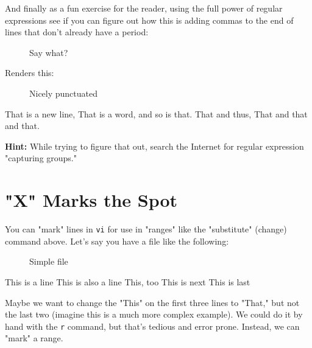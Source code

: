 \documentclass[10pt,american,]{book}
\newenvironment{Shaded}{\begin{snugshade}}{\end{snugshade}}
\newcommand{\KeywordTok}[1]{\textcolor[rgb]{0.13,0.29,0.53}{\textbf{{#1}}}}
\newcommand{\DataTypeTok}[1]{\textcolor[rgb]{0.13,0.29,0.53}{{#1}}}
\newcommand{\OtherTok}[1]{\textcolor[rgb]{0.56,0.35,0.01}{{#1}}}
\newcommand{\NormalTok}[1]{{#1}}
\numberwithin{figure}{chapter}
\DeclareRobustCommand{\drcap}[1]{\begin{figure}[H]\caption{#1}\end{figure}}
\renewcommand{\KeywordTok}[1]{{#1}}
\renewcommand{\DataTypeTok}[1]{{#1}}
\renewcommand{\OtherTok}[1]{{#1}}
\renewcommand{\NormalTok}[1]{{#1}}
\begin{document}
And finally as a fun exercise for the reader, using the full power of
regular expressions see if you can figure out how this is adding commas
to the end of lines that don't already have a period:

\drcap{Say what?}

\begin{Shaded}
\end{Shaded}

Renders this:

\drcap{Nicely punctuated}

\begin{Shaded}
\begin{Highlighting}[]
\KeywordTok{That} \NormalTok{is a new line,}
\KeywordTok{That} \NormalTok{is a word,}
\KeywordTok{and} \NormalTok{so is that.}
\KeywordTok{That} \NormalTok{and thus,}
\KeywordTok{That} \NormalTok{and that and that.}
\end{Highlighting}
\end{Shaded}

\textbf{Hint:} While trying to figure that out, search the Internet for
regular expression "capturing groups."

\section*{"X" Marks the Spot}\label{x-marks-the-spot}

You can "mark" lines in \texttt{vi} for use in "ranges" like the
"substitute" (change) command above. Let's say you have a file like the
following:

\drcap{Simple file}

\begin{Shaded}
\begin{Highlighting}[]
\KeywordTok{This} \NormalTok{is a line}
\KeywordTok{This} \NormalTok{is also a line}
\KeywordTok{This}\NormalTok{, too}
\KeywordTok{This} \NormalTok{is next}
\KeywordTok{This} \NormalTok{is last}
\end{Highlighting}
\end{Shaded}

Maybe we want to change the "This" on the first three lines to "That,"
but not the last two (imagine this is a much more complex example). We
could do it by hand with the \texttt{r} command, but that's tedious and
error prone. Instead, we can "mark" a range.
\end{document}
